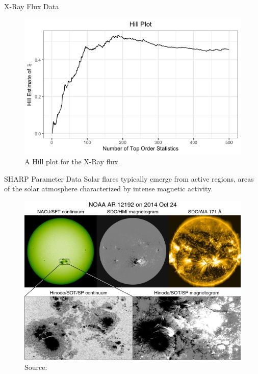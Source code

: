 \documentclass{beamer}
\begin{document}
\begin{frame}{X-Ray Flux Data}
    \begin{figure}
        \centering
        \includegraphics[scale=0.5]{hill_plot.png}
        \caption{A Hill plot for the X-Ray flux.}
        \label{fig:hill_plot}
    \end{figure}
\end{frame}

\begin{frame}{SHARP Parameter Data}
    Solar flares typically emerge from active regions, areas of the solar atmosphere  characterized by intense magnetic activity.
    \begin{figure}
        \centering
        \includegraphics[scale=0.33]{active_region.png}
        \caption{Source: \cite{shin2019flar}}
        \label{fig:active_region}
    \end{figure}
\end{frame} 
\end{document}
